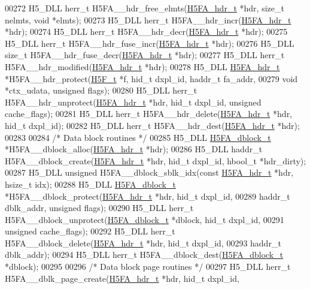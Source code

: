 \begin{DoxyCode}
00272 H5\_DLL herr\_t H5FA\_\_hdr\_free\_elmts(\hyperlink{struct_h5_f_a__hdr__t}{H5FA\_hdr\_t} *hdr, \textcolor{keywordtype}{size\_t} nelmts, \textcolor{keywordtype}{void} *elmts);
00273 H5\_DLL herr\_t H5FA\_\_hdr\_incr(\hyperlink{struct_h5_f_a__hdr__t}{H5FA\_hdr\_t} *hdr);
00274 H5\_DLL herr\_t H5FA\_\_hdr\_decr(\hyperlink{struct_h5_f_a__hdr__t}{H5FA\_hdr\_t} *hdr);
00275 H5\_DLL herr\_t H5FA\_\_hdr\_fuse\_incr(\hyperlink{struct_h5_f_a__hdr__t}{H5FA\_hdr\_t} *hdr);
00276 H5\_DLL \textcolor{keywordtype}{size\_t} H5FA\_\_hdr\_fuse\_decr(\hyperlink{struct_h5_f_a__hdr__t}{H5FA\_hdr\_t} *hdr);
00277 H5\_DLL herr\_t H5FA\_\_hdr\_modified(\hyperlink{struct_h5_f_a__hdr__t}{H5FA\_hdr\_t} *hdr);
00278 H5\_DLL \hyperlink{struct_h5_f_a__hdr__t}{H5FA\_hdr\_t} *H5FA\_\_hdr\_protect(\hyperlink{struct_h5_f__t}{H5F\_t} *f, hid\_t dxpl\_id, haddr\_t fa\_addr,
00279     \textcolor{keywordtype}{void} *ctx\_udata, \textcolor{keywordtype}{unsigned} flags);
00280 H5\_DLL herr\_t H5FA\_\_hdr\_unprotect(\hyperlink{struct_h5_f_a__hdr__t}{H5FA\_hdr\_t} *hdr, hid\_t dxpl\_id, \textcolor{keywordtype}{unsigned} cache\_flags);
00281 H5\_DLL herr\_t H5FA\_\_hdr\_delete(\hyperlink{struct_h5_f_a__hdr__t}{H5FA\_hdr\_t} *hdr, hid\_t dxpl\_id);
00282 H5\_DLL herr\_t H5FA\_\_hdr\_dest(\hyperlink{struct_h5_f_a__hdr__t}{H5FA\_hdr\_t} *hdr);
00283 
00284 \textcolor{comment}{/* Data block routines */}
00285 H5\_DLL \hyperlink{struct_h5_f_a__dblock__t}{H5FA\_dblock\_t} *H5FA\_\_dblock\_alloc(\hyperlink{struct_h5_f_a__hdr__t}{H5FA\_hdr\_t} *hdr);
00286 H5\_DLL haddr\_t H5FA\_\_dblock\_create(\hyperlink{struct_h5_f_a__hdr__t}{H5FA\_hdr\_t} *hdr, hid\_t dxpl\_id, hbool\_t *hdr\_dirty);
00287 H5\_DLL \textcolor{keywordtype}{unsigned} H5FA\_\_dblock\_sblk\_idx(\textcolor{keyword}{const} \hyperlink{struct_h5_f_a__hdr__t}{H5FA\_hdr\_t} *hdr, hsize\_t idx);
00288 H5\_DLL \hyperlink{struct_h5_f_a__dblock__t}{H5FA\_dblock\_t} *H5FA\_\_dblock\_protect(\hyperlink{struct_h5_f_a__hdr__t}{H5FA\_hdr\_t} *hdr, hid\_t dxpl\_id,
00289     haddr\_t dblk\_addr, \textcolor{keywordtype}{unsigned} flags);
00290 H5\_DLL herr\_t H5FA\_\_dblock\_unprotect(\hyperlink{struct_h5_f_a__dblock__t}{H5FA\_dblock\_t} *dblock, hid\_t dxpl\_id,
00291     \textcolor{keywordtype}{unsigned} cache\_flags);
00292 H5\_DLL herr\_t H5FA\_\_dblock\_delete(\hyperlink{struct_h5_f_a__hdr__t}{H5FA\_hdr\_t} *hdr, hid\_t dxpl\_id,
00293     haddr\_t dblk\_addr);
00294 H5\_DLL herr\_t H5FA\_\_dblock\_dest(\hyperlink{struct_h5_f_a__dblock__t}{H5FA\_dblock\_t} *dblock);
00295 
00296 \textcolor{comment}{/* Data block page routines */}
00297 H5\_DLL herr\_t H5FA\_\_dblk\_page\_create(\hyperlink{struct_h5_f_a__hdr__t}{H5FA\_hdr\_t} *hdr, hid\_t dxpl\_id,

\end{DoxyCode}
